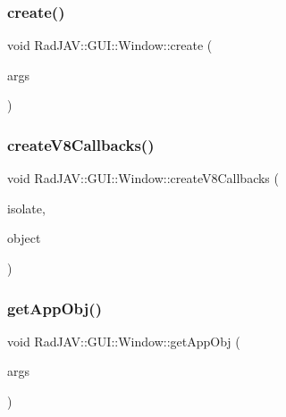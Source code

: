 \subsubsection{\texorpdfstring{create()}{create()}}
{\footnotesize\ttfamily void Rad\+J\+A\+V\+::\+G\+U\+I\+::\+Window\+::create (\begin{DoxyParamCaption}\item[{const v8\+::\+Function\+Callback\+Info$<$ v8\+::\+Value $>$ \&}]{args }\end{DoxyParamCaption})\hspace{0.3cm}{\ttfamily [static]}}

\mbox{\label{class_rad_j_a_v_1_1_g_u_i_1_1_window_a97ca3e7298a0110afcc5d363e8e9ca3a}} 
\subsubsection{\texorpdfstring{create\+V8\+Callbacks()}{createV8Callbacks()}}
{\footnotesize\ttfamily void Rad\+J\+A\+V\+::\+G\+U\+I\+::\+Window\+::create\+V8\+Callbacks (\begin{DoxyParamCaption}\item[{v8\+::\+Isolate $\ast$}]{isolate,  }\item[{v8\+::\+Local$<$ v8\+::\+Object $>$}]{object }\end{DoxyParamCaption})\hspace{0.3cm}{\ttfamily [static]}}

\mbox{\label{class_rad_j_a_v_1_1_g_u_i_1_1_window_aa9762d526df77f54e378c19606611481}} 
\subsubsection{\texorpdfstring{get\+App\+Obj()}{getAppObj()}}
{\footnotesize\ttfamily void Rad\+J\+A\+V\+::\+G\+U\+I\+::\+Window\+::get\+App\+Obj (\begin{DoxyParamCaption}\item[{const v8\+::\+Function\+Callback\+Info$<$ v8\+::\+Value $>$ \&}]{args }\end{DoxyParamCaption})\hspace{0.3cm}{\ttfamily [static]}}

